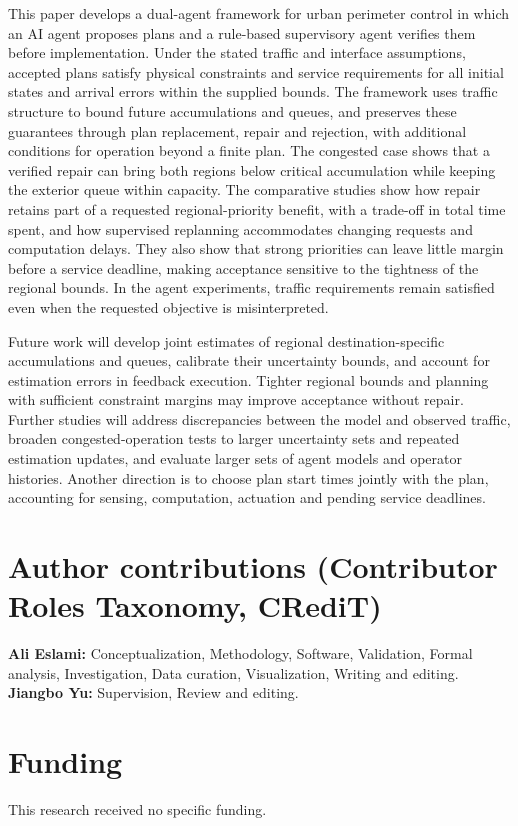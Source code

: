 \documentclass[final]{cas-sc}
\theoremstyle{definition}
\theoremstyle{plain}
\theoremstyle{definition}
\theoremstyle{plain}
\begin{document}
This paper develops a dual-agent framework for urban perimeter control
in which an AI agent proposes plans and a rule-based supervisory agent
verifies them before implementation. Under the stated traffic and
interface assumptions, accepted plans satisfy physical constraints and
service requirements for all initial states and arrival errors within
the supplied bounds. The framework uses traffic structure to bound
future accumulations and queues, and preserves these guarantees through
plan replacement, repair and rejection, with additional conditions for
operation beyond a finite plan. The congested case shows that a verified
repair can bring both regions below critical accumulation while keeping
the exterior queue within capacity. The comparative studies show how
repair retains part of a requested regional-priority benefit, with a
trade-off in total time spent, and how supervised replanning accommodates
changing requests and computation delays. They also show that strong
priorities can leave little margin before a service deadline, making
acceptance sensitive to the tightness of the regional bounds. In the
agent experiments, traffic requirements remain satisfied even when
the requested objective is misinterpreted.

Future work will develop joint estimates of regional destination-specific accumulations
and queues, calibrate their uncertainty bounds, and account for estimation
errors in feedback execution. Tighter regional bounds and planning
with sufficient constraint margins may improve acceptance without
repair. Further studies will address discrepancies between the model
and observed traffic, broaden congested-operation
tests to larger uncertainty sets and repeated estimation updates, and
evaluate larger sets of agent models and operator histories. Another
direction is to choose plan start times jointly with the plan, accounting
for sensing, computation, actuation and pending service deadlines.

\section*{Author contributions (Contributor Roles Taxonomy, CRediT)}
\textbf{Ali Eslami:} Conceptualization, Methodology, Software, Validation,
Formal analysis, Investigation, Data curation, Visualization,
Writing and editing.
\textbf{Jiangbo Yu:} Supervision, Review and editing.

\section*{Funding}
This research received no specific funding.
\end{document}
